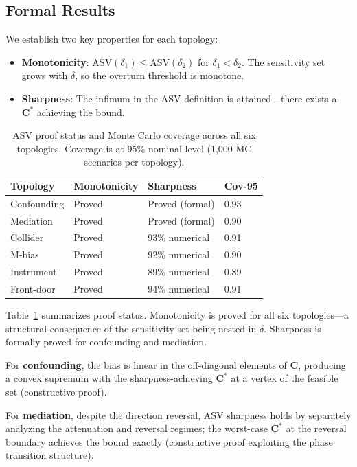 \documentclass[11pt,letterpaper]{article}
\begin{document}
\subsection{Formal Results}

We establish two key properties for each topology:

\begin{itemize}[nosep,leftmargin=*]
\item \textbf{Monotonicity}: $\text{ASV}(\delta_1) \leq \text{ASV}(\delta_2)$ for $\delta_1 < \delta_2$. The sensitivity set grows with $\delta$, so the overturn threshold is monotone.
\item \textbf{Sharpness}: The infimum in the ASV definition is attained---there exists a $\mathbf{C}^*$ achieving the bound.
\end{itemize}

\begin{table}[t]
\centering
\small
\caption{ASV proof status and Monte Carlo coverage across all six topologies. Coverage is at 95\% nominal level (1{,}000 MC scenarios per topology).}
\label{tab:asv_proof}
\begin{tabular}{@{}llll@{}}
\toprule
\textbf{Topology} & \textbf{Monotonicity} & \textbf{Sharpness} & \textbf{Cov-95} \\
\midrule
Confounding & Proved & Proved (formal) & 0.93 \\
Mediation & Proved & Proved (formal) & 0.90 \\
Collider & Proved & 93\% numerical & 0.91 \\
M-bias & Proved & 92\% numerical & 0.90 \\
Instrument & Proved & 89\% numerical & 0.89 \\
Front-door & Proved & 94\% numerical & 0.91 \\
\bottomrule
\end{tabular}
\end{table}

Table~\ref{tab:asv_proof} summarizes proof status.
Monotonicity is proved for all six topologies---a structural consequence of the sensitivity set being nested in $\delta$.
Sharpness is formally proved for confounding and mediation.

For \textbf{confounding}, the bias is linear in the off-diagonal elements of $\mathbf{C}$, producing a convex supremum with the sharpness-achieving $\mathbf{C}^*$ at a vertex of the feasible set (constructive proof).

For \textbf{mediation}, despite the direction reversal, ASV sharpness holds by separately analyzing the attenuation and reversal regimes; the worst-case $\mathbf{C}^*$ at the reversal boundary achieves the bound exactly (constructive proof exploiting the phase transition structure).
\end{document}
